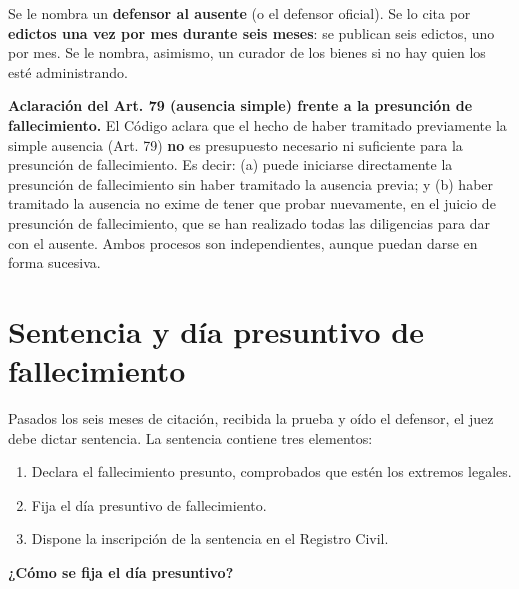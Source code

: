 \documentclass[12pt,oneside]{book}
\begin{document}
Se le nombra un \textbf{defensor al ausente} (o el defensor oficial). Se
lo cita por \textbf{edictos una vez por mes durante seis meses}: se
publican seis edictos, uno por mes. Se le nombra, asimismo, un curador de
los bienes si no hay quien los esté administrando.

\begin{important}
\textbf{Aclaración del Art. 79 (ausencia simple) frente a la presunción
de fallecimiento.} El Código aclara que el hecho de haber tramitado
previamente la simple ausencia (Art. 79) \textbf{no} es presupuesto
necesario ni suficiente para la presunción de fallecimiento. Es decir:
(a) puede iniciarse directamente la presunción de fallecimiento sin haber
tramitado la ausencia previa; y (b) haber tramitado la ausencia no exime
de tener que probar nuevamente, en el juicio de presunción de
fallecimiento, que se han realizado todas las diligencias para dar con el
ausente. Ambos procesos son independientes, aunque puedan darse en forma
sucesiva.
\end{important}

\section{Sentencia y día presuntivo de fallecimiento}

Pasados los seis meses de citación, recibida la prueba y oído el
defensor, el juez debe dictar sentencia. La sentencia contiene tres
elementos:

\begin{enumerate}
    \item Declara el fallecimiento presunto, comprobados que estén los extremos legales.
    \item Fija el día presuntivo de fallecimiento.
    \item Dispone la inscripción de la sentencia en el Registro Civil.
\end{enumerate}

\textbf{¿Cómo se fija el día presuntivo?}
\end{document}
